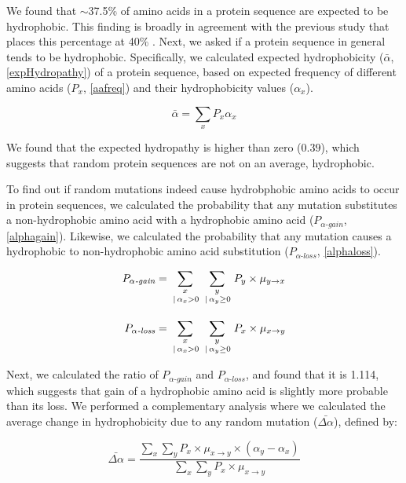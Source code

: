 \documentclass[12pt,a4paper]{article}
\begin{document}
We found that $\sim$37.5\% of amino acids in a protein sequence are expected to be hydrophobic. This finding is broadly in agreement with the previous study that places this percentage at 40\% \citep{hydrophobicRatchet}. Next, we asked if a protein sequence in general tends to be hydrophobic. Specifically, we calculated expected hydrophobicity ($\bar{\alpha}$, \autoref{expHydropathy}) of a protein sequence, based on expected frequency of different amino acids ($P_x$, \autoref{aafreq}) and their hydrophobicity values ($\alpha_x$). 

\begin{equation}
\bar{\alpha} = \sum_{x} P_x \alpha_x
\label{expHydropathy}
\end{equation}


We found that the expected hydropathy is higher than zero ($0.39$), which suggests that random protein sequences are not on an average, hydrophobic.
 
To find out if random mutations indeed cause hydrobphobic amino acids to occur in protein sequences, we calculated the probability that any mutation substitutes a non-hydrophobic amino acid with a hydrophobic amino acid ($P_{\alpha\textit{-gain}}$, \autoref{alphagain}). Likewise, we calculated the probability that any mutation causes a hydrophobic to non-hydrophobic amino acid substitution ($P_{\alpha\textit{-loss}}$, \autoref{alphaloss}).  

\begin{align}
P_{\alpha\textit{-gain}} & = \sum_{\genfrac{}{}{0pt}{1}{x}{\,|\,\alpha_x>0}} \sum_{\genfrac{}{}{0pt}{1}{y}{\,|\,\alpha_y \geq 0}} P_y \times \mu_{y\to x}\label{alphagain}\\[1em]
%
P_{\alpha\textit{-loss}} &= \sum_{\genfrac{}{}{0pt}{1}{x}{\,|\,\alpha_x>0}} \sum_{\genfrac{}{}{0pt}{1}{y}{\,|\,\alpha_y \geq 0}} P_x \times \mu_{x\to y}\label{alphaloss}
\end{align}

Next, we calculated the ratio of $P_{\alpha\textit{-gain}}$ and $P_{\alpha\textit{-loss}}$, and found that it is 1.114, which suggests that gain of a hydrophobic amino acid is slightly more probable than its loss. We performed a complementary analysis where we calculated the average change in hydrophobicity due to any random mutation ($\bar{\Delta\alpha}$), defined by:

\begin{equation}
\bar{\Delta\alpha} = \frac{\displaystyle\sum_{x} \sum_{y} P_x \times \mu_{x\to y} \times (\alpha_y - \alpha_x)}{\displaystyle\sum_{x} \sum_{y} P_x \times \mu_{x\to y}}
\end{equation}
\end{document}

